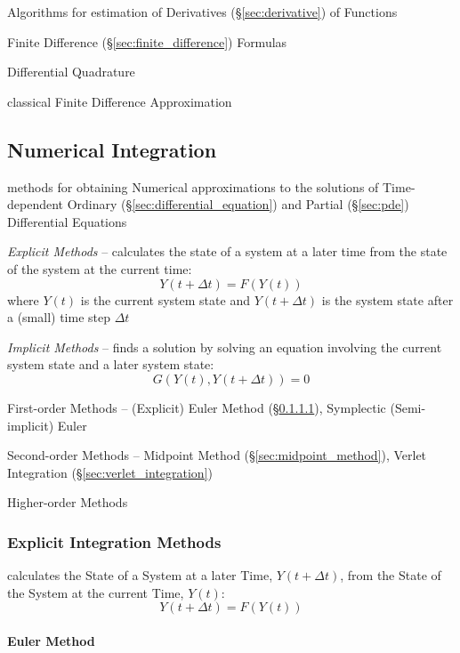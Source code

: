 Algorithms for estimation of Derivatives (\S\ref{sec:derivative}) of Functions

Finite Difference (\S\ref{sec:finite_difference}) Formulas

Differential Quadrature

classical Finite Difference Approximation 



\subsection{Numerical Integration}\label{sec:numerical_integration}

methods for obtaining Numerical approximations to the solutions of
Time-dependent Ordinary (\S\ref{sec:differential_equation}) and Partial
(\S\ref{sec:pde}) Differential Equations

\emph{Explicit Methods} -- calculates the state of a system at a later time
from the state of the system at the current time:
\[
  Y(t+\Delta{t}) = F(Y(t))
\]
where $Y(t)$ is the current system state and $Y(t + \Delta{t})$ is the system
state after a (small) time step $\Delta{t}$

\emph{Implicit Methods} -- finds a solution by solving an equation involving
the current system state and a later system state:
\[
  G(Y(t), Y(t + \Delta{t})) = 0
\]

First-order Methods -- (Explicit) Euler Method (\S\ref{sec:euler_method}),
Symplectic (Semi-implicit) Euler

Second-order Methods -- Midpoint Method (\S\ref{sec:midpoint_method}), Verlet
Integration (\S\ref{sec:verlet_integration})

Higher-order Methods



\subsubsection{Explicit Integration Methods}\label{sec:explicit_integration}

calculates the State of a System at a later Time, $Y(t + \Delta{t})$, from the
State of the System at the current Time, $Y(t)$:
\[
  Y(t + \Delta{t}) = F(Y(t))
\]



\paragraph{Euler Method}\label{sec:euler_method}\hfill

